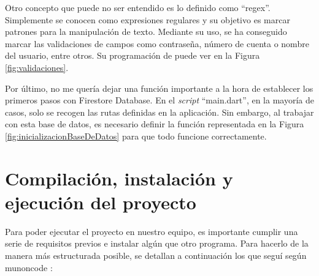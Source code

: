 
	Otro concepto que puede no ser entendido es lo definido como ``regex''. Simplemente se conocen como expresiones regulares y su objetivo es marcar patrones para la manipulación de texto. Mediante su uso, se ha conseguido marcar las validaciones de campos como contraseña, número de cuenta o nombre del usuario, entre otros. Su programación de puede ver en la Figura \ref{fig:validaciones}.
	 

	Por último, no me quería dejar una función importante a la hora de establecer los primeros pasos con Firestore Database. En el \emph{script} ``main.dart'', en la mayoría de casos, solo se recogen las rutas definidas en la aplicación. Sin embargo, al trabajar con esta base de datos, es necesario definir la función representada en la Figura \ref{fig:inicializacionBaseDeDatos} para que todo funcione correctamente.
	


\section{Compilación, instalación y ejecución del proyecto}

	Para poder ejecutar el proyecto en nuestro equipo, es importante cumplir una serie de requisitos previos e instalar algún que otro programa. Para hacerlo de la manera más estructurada posible, se detallan a continuación los que seguí según munoncode \cite{instalacion:flutter}:
	
